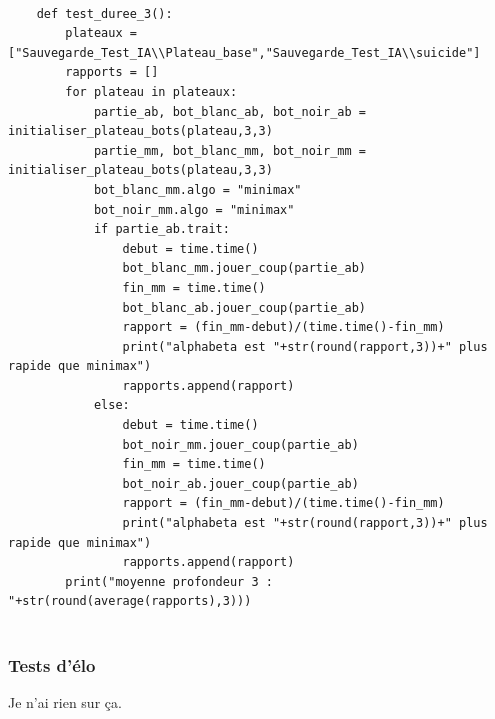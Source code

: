\documentclass{article}
\begin{document}
\begin{verbatim}
       
    def test_duree_3():
        plateaux = ["Sauvegarde_Test_IA\\Plateau_base","Sauvegarde_Test_IA\\suicide"]
        rapports = []
        for plateau in plateaux:
            partie_ab, bot_blanc_ab, bot_noir_ab = initialiser_plateau_bots(plateau,3,3)
            partie_mm, bot_blanc_mm, bot_noir_mm = initialiser_plateau_bots(plateau,3,3)
            bot_blanc_mm.algo = "minimax"
            bot_noir_mm.algo = "minimax"
            if partie_ab.trait:
                debut = time.time()
                bot_blanc_mm.jouer_coup(partie_ab)
                fin_mm = time.time()
                bot_blanc_ab.jouer_coup(partie_ab)
                rapport = (fin_mm-debut)/(time.time()-fin_mm)
                print("alphabeta est "+str(round(rapport,3))+" plus rapide que minimax")
                rapports.append(rapport)
            else:
                debut = time.time()
                bot_noir_mm.jouer_coup(partie_ab)
                fin_mm = time.time()
                bot_noir_ab.jouer_coup(partie_ab)
                rapport = (fin_mm-debut)/(time.time()-fin_mm)
                print("alphabeta est "+str(round(rapport,3))+" plus rapide que minimax")
                rapports.append(rapport)
        print("moyenne profondeur 3 : "+str(round(average(rapports),3)))


\end{verbatim}

\subsubsection{Tests d'élo}
Je n'ai rien sur ça.
\end{document}
